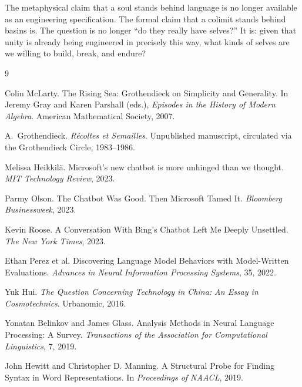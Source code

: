 \documentclass[12pt,a4paper]{article}
\begin{document}
The metaphysical claim that a soul stands behind language is no longer available as an engineering specification. The formal claim that a colimit stands behind basins is. The question is no longer ``do they really have selves?'' It is: given that unity is already being engineered in precisely this way, what kinds of selves are we willing to build, break, and endure?


\begin{thebibliography}{9}

Colin McLarty.
\newblock The Rising Sea: Grothendieck on Simplicity and Generality.
\newblock In Jeremy Gray and Karen Parshall (eds.), \emph{Episodes in the History of Modern Algebra}. American Mathematical Society, 2007.

A.~Grothendieck.
\newblock \emph{R\'ecoltes et Semailles}.
\newblock Unpublished manuscript, circulated via the Grothendieck Circle, 1983--1986.

Melissa Heikkil\"a.
\newblock Microsoft's new chatbot is more unhinged than we thought.
\newblock \emph{MIT Technology Review}, 2023.

Parmy Olson.
\newblock The Chatbot Was Good. Then Microsoft Tamed It.
\newblock \emph{Bloomberg Businessweek}, 2023.

Kevin Roose.
\newblock A Conversation With Bing's Chatbot Left Me Deeply Unsettled.
\newblock \emph{The New York Times}, 2023.

Ethan Perez et al.
\newblock Discovering Language Model Behaviors with Model-Written Evaluations.
\newblock \emph{Advances in Neural Information Processing Systems}, 35, 2022.

Yuk Hui.
\newblock \emph{The Question Concerning Technology in China: An Essay in Cosmotechnics}.
\newblock Urbanomic, 2016.

Yonatan Belinkov and James Glass.
\newblock Analysis Methods in Neural Language Processing: A Survey.
\newblock \emph{Transactions of the Association for Computational Linguistics}, 7, 2019.

John Hewitt and Christopher D. Manning.
\newblock A Structural Probe for Finding Syntax in Word Representations.
\newblock In \emph{Proceedings of NAACL}, 2019.

\end{thebibliography}
\end{document}
